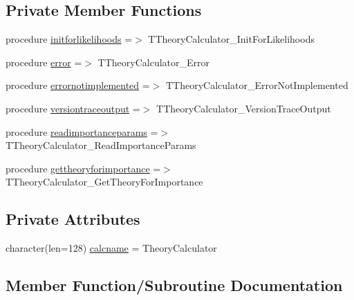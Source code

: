 \subsection*{Private Member Functions}
\begin{DoxyCompactItemize}
\item 
procedure \mbox{\hyperlink{structgeneraltypes_1_1ttheorycalculator_a7a8d3f8faf29835efad73f3401523b9b}{initforlikelihoods}} =$>$ T\+Theory\+Calculator\+\_\+\+Init\+For\+Likelihoods
\item 
procedure \mbox{\hyperlink{structgeneraltypes_1_1ttheorycalculator_ab1ff3c4aaff16749e6e6d1fa19e7afe8}{error}} =$>$ T\+Theory\+Calculator\+\_\+\+Error
\item 
procedure \mbox{\hyperlink{structgeneraltypes_1_1ttheorycalculator_ae95e28cbfb06ebc4d5af2c71108fcb12}{errornotimplemented}} =$>$ T\+Theory\+Calculator\+\_\+\+Error\+Not\+Implemented
\item 
procedure \mbox{\hyperlink{structgeneraltypes_1_1ttheorycalculator_a38b00a30f5a0569d53890ea8dc326331}{versiontraceoutput}} =$>$ T\+Theory\+Calculator\+\_\+\+Version\+Trace\+Output
\item 
procedure \mbox{\hyperlink{structgeneraltypes_1_1ttheorycalculator_a098a9c8c003e770df9e6b55628b69187}{readimportanceparams}} =$>$ T\+Theory\+Calculator\+\_\+\+Read\+Importance\+Params
\item 
procedure \mbox{\hyperlink{structgeneraltypes_1_1ttheorycalculator_a1555d62885d4f092861b394f878c9058}{gettheoryforimportance}} =$>$ T\+Theory\+Calculator\+\_\+\+Get\+Theory\+For\+Importance
\end{DoxyCompactItemize}
\subsection*{Private Attributes}
\begin{DoxyCompactItemize}
\item 
character(len=128) \mbox{\hyperlink{structgeneraltypes_1_1ttheorycalculator_a067210b836798b1f943cece4b98030ca}{calcname}} = \textquotesingle{}Theory\+Calculator\textquotesingle{}
\end{DoxyCompactItemize}


\subsection{Member Function/\+Subroutine Documentation}
\mbox{\label{structgeneraltypes_1_1ttheorycalculator_ab1ff3c4aaff16749e6e6d1fa19e7afe8}} 
